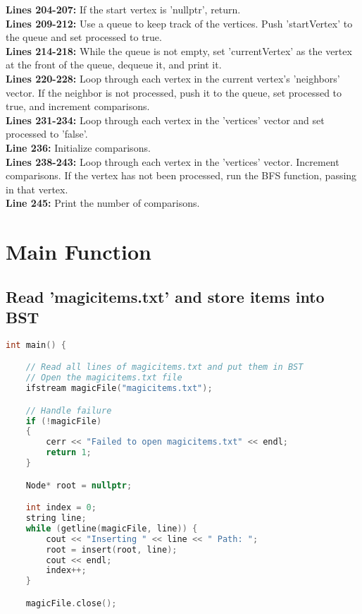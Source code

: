 \documentclass[letterpaper, 10pt,DIV=13]{scrartcl}
\numberwithin{equation}{section} %
\numberwithin{figure}{section} %
\numberwithin{table}{section} %
\begin{document}
\textbf{Lines 204-207:} If the start vertex is 'nullptr', return. \\
\textbf{Lines 209-212:} Use a queue to keep track of the vertices. Push 'startVertex' to the queue and set processed to true. \\
\textbf{Lines 214-218:} While the queue is not empty, set 'currentVertex' as the vertex at the front of the queue, dequeue it, and print it. \\
\textbf{Lines 220-228:} Loop through each vertex in the current vertex's 'neighbors' vector. If the neighbor is not processed, push it to the queue, set processed to true, and increment comparisons. \\
\textbf{Lines 231-234:} Loop through each vertex in the 'vertices' vector and set processed to 'false'. \\
\textbf{Line 236:} Initialize comparisons. \\
\textbf{Lines 238-243:} Loop through each vertex in the 'vertices' vector. Increment comparisons. If the vertex has not been processed, run the BFS function, passing in that vertex. \\
\textbf{Line 245:} Print the number of comparisons. \\


\pagebreak

\section{Main Function}
\subsection{Read 'magicitems.txt' and store items into BST}
\begin{linenumbers}
\begin{lstlisting}[language=C++, caption={Store Items in BST}, label={code:example}]
int main() {

    // Read all lines of magicitems.txt and put them in BST
    // Open the magicitems.txt file
    ifstream magicFile("magicitems.txt");

    // Handle failure
    if (!magicFile)
    {
        cerr << "Failed to open magicitems.txt" << endl;
        return 1;
    }

    Node* root = nullptr;

    int index = 0;
    string line;
    while (getline(magicFile, line)) {
        cout << "Inserting " << line << " Path: ";
        root = insert(root, line);
        cout << endl;
        index++;
    }

    magicFile.close();
\end{lstlisting}
\end{linenumbers}
\nolinenumbers
\end{document}
